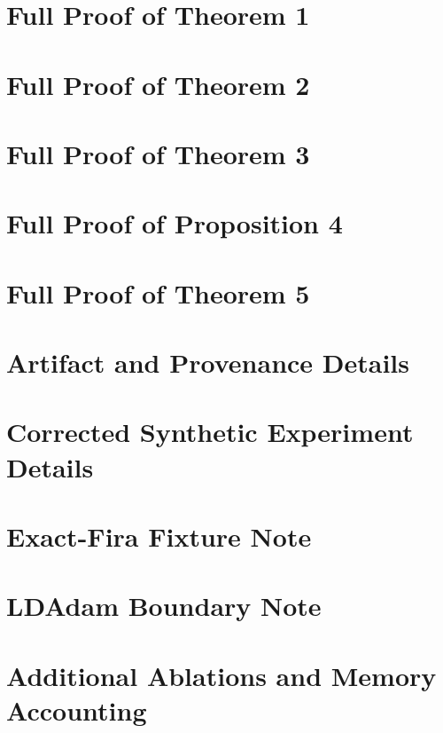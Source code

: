 \section{Full Proof of Theorem 1}


\section{Full Proof of Theorem 2}


\section{Full Proof of Theorem 3}


\section{Full Proof of Proposition 4}


\section{Full Proof of Theorem 5}


\section{Artifact and Provenance Details}


\section{Corrected Synthetic Experiment Details}


\section{Exact-Fira Fixture Note}


\section{LDAdam Boundary Note}


\section{Additional Ablations and Memory Accounting}


